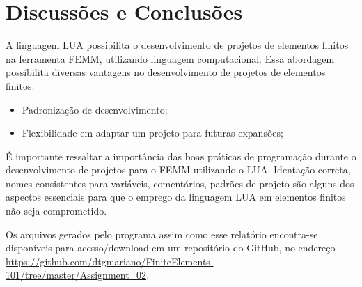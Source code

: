 \section{Discussões e Conclusões}
A linguagem LUA possibilita o desenvolvimento de projetos de elementos finitos na ferramenta FEMM, utilizando linguagem computacional. Essa abordagem possibilita diversas vantagens no desenvolvimento de projetos de elementos finitos:
\begin{itemize}
  \item Padronização de desenvolvimento;
  \item Flexibilidade em adaptar um projeto para futuras expansões;
\end{itemize}
%

É importante ressaltar a importância das boas práticas de programação durante o desenvolvimento de projetos para o FEMM utilizando o LUA. Identação correta, nomes consistentes para variáveis, comentários, padrões de projeto são alguns dos aspectos essenciais para que o emprego da linguagem LUA em elementos finitos não seja comprometido.
%

Os arquivos gerados pelo programa assim como esse relatório encontra-se disponíveis para acesso/download em um repositório do GitHub, no endereço \url{https://github.com/dtgmariano/FiniteElements-101/tree/master/Assignment_02}.
